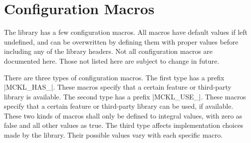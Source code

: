 %
%
%
%

\chapter{Configuration Macros}
\label{chap:Configuration Macros}

The library has a few configuration macros. All macros have default values if
left undefined, and can be overwritten by defining them with proper values
before including any of the library headers. Not all configuration macros are
documented here. Those not listed here are subject to change in future.

There are three types of configuration macros. The first type has a prefix
|MCKL_HAS_|. These macros specify that a certain feature or third-party library
is available. The second type has a prefix |MCKL_USE_|. These macros specify
that a certain feature or third-party library can be used, if available. These
two kinds of macros shall only be defined to integral values, with zero as
false and all other values as true. The third type affects implementation
choices made by the library. Their possible values vary with each specific
macro.

